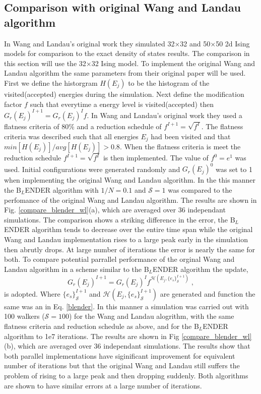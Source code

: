 \documentclass[aps,pre,reprint,superscriptaddress,showkeys]{revtex4-1}
\begin{document}
\subsection{Comparison with original Wang and Landau algorithm}
In Wang and Landau's original work they simulated  32$\times$32 and 50$\times$50 2d Ising models for comparison to the exact density of states results. The comparison in this section will use the 32$\times$32 Ising model. To implement the original Wang and Landau algorithm the same parameters from their original paper will be used\cite{WL_phys_rev_lett}. First we define the historgram $H(E_j)$ to be the histogram of the visited(accepted) energies during the simulation. Next define the modification factor $f$ such that everytime a energy level is visited(accepted) then $G_r(E_j)^{I+1} = G_r(E_j)^{I}f$. In Wang and Landau's original work they used a flatness criteria of $80\%$ and a reduction schedule of $f^{I+1}= \sqrt{f^{I}}$. The flatness criteria was described such that all energies $E_j$ had been visited and that  $min[H(E_j)]/avg[H(E_j)] > 0.8$. When the flatness criteria is meet the reduction schedule $f^{I+1}= \sqrt{f^{I}}$ is then implemented. The value of $f^0 = e^1$ was used. Initial configurations were generated randomly and $G_r(E_j)^0$ was set to 1 when implementing the original Wang and Landau algorithm.  In the this manner the B$_L$ENDER algorithm with $1/N = 0.1$ and $\mathcal{S}=1$ was compared to the perfomance of the original Wang and Landau algorithm. The results are shown in Fig. \ref{compare_blender_wl}(a), which are averaged over 36 independant simulations. The comparison shows a striking difference in the error,  the B$_L$ENDER algorithm  tends to decrease over the entire time span while the original Wang and Landau implementation  rises to a large peak early in the simulation then abrutly drops. At large number of iterations the error is nearly the same for both. To compare potential parrallel performance of the orginal Wang and Landau algorithm in a scheme similar to the B$_L$ENDER algorithm the update,
\begin{equation}
G_r(E_j)^{I+1} = G_r(E_j)^{I}f^{\mathcal{H}(E_j,\{e_s\}^{I+1}_{\mathcal{S}})}\;,
\label{parallelscheme}
\end{equation}
is adopted. Where $\{e_s\}^{I+1}_{\mathcal{S}}$ and $\mathcal{H}(E_j,\{e_s\}^{I+1}_{\mathcal{S}})$ are generated and function the same was an in Eq. \ref{blender}. In this manner a simulation was carried out with 100 walkers ($\mathcal{S}=100$) for the Wang and Landau alogrithm, with the same flatness criteria and reduction schedule as above, and for the B$_L$ENDER algorithm to 1e7 iterations. The results are shown in Fig \ref{compare_blender_wl}(b), which are averaged over 36 independant simulations. The results show that both parallel implementations have siginificant improvement for equivalent number of iterations but that the original Wang and Landau still suffers the problem of rising to a large peak and then dropping suddenly. Both algorithms are shown to have similar errors at a large number of iterations. 
\end{document}
